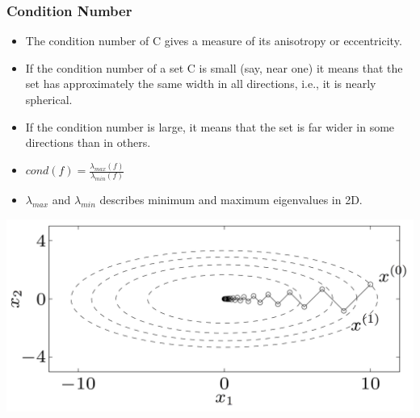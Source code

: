 \begin{frame}
{}



\end{frame}


\begin{frame}
\frametitle{Condition Number}
\begin{itemize}
\item The condition number of C gives a measure of its anisotropy or
  eccentricity.
\item If the condition number of a set C is small (say, near one) it
  means that the set has approximately the same width in all
  directions, i.e., it is nearly spherical.
\item If the condition number is large, it means that the set is far
  wider in some directions than in others.
\item $cond(f) = \frac{\lambda_{max}(f)}{\lambda_{min}(f)}$
\item $\lambda_{max}$ and $\lambda_{min}$ describes minimum and maximum eigenvalues in 2D.
\end{itemize}

\includegraphics[scale=0.08, right]{pics/example.png}
\end{frame}

